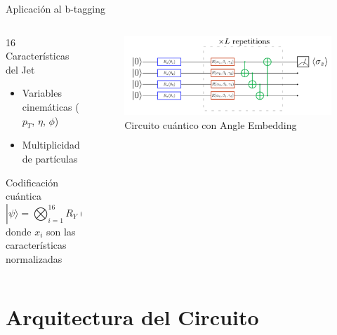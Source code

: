 \documentclass[aspectratio=43]{beamer}
\begin{document}
\begin{frame}{Aplicación al b-tagging}
  \begin{columns}
    \begin{column}{0.45\textwidth}
      \begin{block}{16 Características del Jet}
        \begin{itemize}
          \item Variables cinemáticas (\texorpdfstring{$p_T$}{pT}, \texorpdfstring{$\eta$}{eta}, \texorpdfstring{$\phi$}{phi})
          \item Multiplicidad de partículas
        \end{itemize}
      \end{block}
      \begin{alertblock}{Codificación cuántica}
        \[ |\psi\rangle = \bigotimes_{i=1}^{16} R_Y(x_i)|0\rangle \]
        donde $x_i$ son las características normalizadas
      \end{alertblock}
    \end{column}
    \begin{column}{0.55\textwidth}
      \begin{figure}
        \includegraphics[width=\textwidth]{angleemb.png}
        \caption{\small Circuito cuántico con Angle Embedding}
      \end{figure}
    \end{column}
  \end{columns}
\end{frame}

\section{Arquitectura del Circuito}
\end{document}
